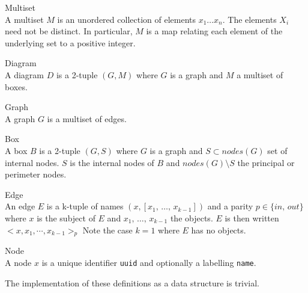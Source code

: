         \begin{definition}{Multiset\\}
            A multiset $M$ is an unordered collection of elements $x_1 \ldots x_n$.
            The elements $X_i$ need not be distinct.
            In particular, $M$ is a map relating each element of the underlying set to a positive integer.
        \end{definition}
        \begin{definition}{Diagram\\}
            A diagram $D$ is a 2-tuple $(G, M)$ where $G$ is a graph and $M$ a multiset of boxes.
        \end{definition}
        \begin{definition}{Graph\\}
            A graph $G$ is a multiset of edges.
        \end{definition}
        \begin{definition}{Box\\}
            A box $B$ is a 2-tuple $(G, S)$ where $G$ is a graph and $S \subset nodes(G)$ set of internal nodes.
            $S$ is the internal nodes of $B$ and $nodes(G) \setminus S$ the principal or perimeter nodes.
        \end{definition}
        \begin{definition}{Edge\\}
            An edge $E$ is a k-tuple of names $(x, [x_1, \, \ldots, \, x_{k-1}])$ and a parity $p \in \{in, \, out\}$ where $x$ is the subject of $E$ and $x_1, \, \ldots, \, x_{k-1}$ the objects.
            $E$ is then written $<x, x_1, \cdots, x_{k-1}>_p$
            Note the case $k = 1$ where $E$ has no objects.
        \end{definition}
        \begin{definition}{Node\\}
            A node $x$ is a unique identifier \texttt{uuid} and optionally a labelling \texttt{name}.
        \end{definition}

        The implementation of these definitions as a data structure is trivial.\\

